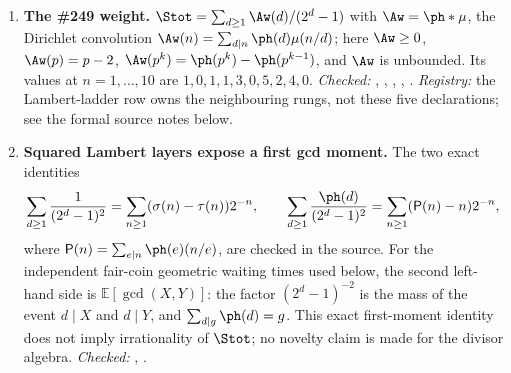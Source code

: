 {\begin{enumerate}[label=\textbf{R\arabic*.},ref=R\arabic*,leftmargin=2.4em,
  itemsep=0.2em,topsep=0.25em]
The orbit-level form sharpens this rank barrier without closing it: under the
same non-irrationality hypothesis, the same carry also has uniformly eventual
dyadic-section periodicity modulo $v$, as recorded by
.
This does not turn quotient periodicity into a finite-$\mathbb Q$-rank bound.
Indeed, if $p\mid v$, the totient forcing disappears modulo $p$ and the carry
is the homogeneous geometric orbit $u_N\equiv2^N u_0$ modulo $p$
(;
).
This is the natural obstruction to extracting the missing finite-rank upper
bound, so the irrationality of $\Stot$ remains open.

\item\label{res:weight} 
\textbf{The \#249 weight.}  $\Stot=\sum_{d\ge1}\Aw(d)/(2^d-1)$ with
$\Aw=\ph*\mu$, the Dirichlet convolution
$\Aw(n)=\sum_{d\mid n}\ph(d)\mu(n/d)$; here $\Aw\ge0$, $\Aw(p)=p-2$,
$\Aw(p^k)=\ph(p^k)-\ph(p^{k-1})$, and $\Aw$ is unbounded.  Its values at
$n=1,\dots,10$ are $1,0,1,1,3,0,5,2,4,0$.
{\footnotesize\emph{Checked:}
,
,
,
,
.
\emph{Registry:} the Lambert-ladder row owns the neighbouring rungs, not these
five declarations; see the formal source notes below.}

\item\label{res:gcdmoment} 
\textbf{Squared Lambert layers expose a first gcd moment.}  The two exact
identities
\[
  \sum_{d\ge1}\frac{1}{(2^d-1)^2}
    =\sum_{n\ge1}(\sigma(n)-\tau(n))2^{-n},
  \qquad
  \sum_{d\ge1}\frac{\ph(d)}{(2^d-1)^2}
    =\sum_{n\ge1}(\mathsf P(n)-n)2^{-n},
\]
where $\mathsf P(n)=\sum_{e\mid n}\ph(e)(n/e)$, are checked in the
source.  For the independent fair-coin geometric waiting times used below,
the second left-hand side is $\mathbb E[\gcd(X,Y)]$: the factor
$(2^d-1)^{-2}$ is the mass of the event $d\mid X$ and $d\mid Y$, and
$\sum_{d\mid g}\ph(d)=g$.  This exact first-moment identity does not imply
irrationality of $\Stot$; no novelty claim is made for the
divisor algebra.
{\footnotesize\emph{Checked:}
,
.}


\end{enumerate}}
